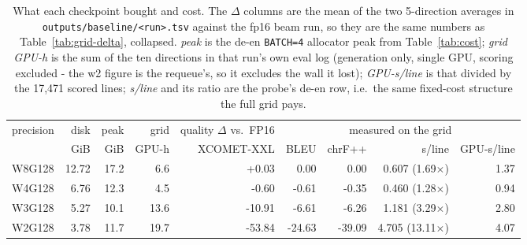 \begin{table}[t]
\centering
\footnotesize
\setlength{\tabcolsep}{4pt}
\begin{tabular}{lrrrrrrrr}
\toprule
precision & disk & peak & grid & quality $\Delta$ vs.\ FP16 & \multicolumn{4}{c}{measured on the grid} \\
\cmidrule(lr){6-6}\cmidrule(lr){7-9}
& GiB & GiB & GPU-h & XCOMET-XXL & BLEU & chrF++ & s/line & GPU-s/line \\
\midrule
W8G128 & 12.72 & 17.2 & 6.6 & +0.03 & 0.00 & 0.00 & 0.607 (1.69$\times$) & 1.37 \\
W4G128 & 6.76 & 12.3 & 4.5 & -0.60 & -0.61 & -0.35 & 0.460 (1.28$\times$) & 0.94 \\
W3G128 & 5.27 & 10.1 & 13.6 & -10.91 & -6.61 & -6.26 & 1.181 (3.29$\times$) & 2.80 \\
W2G128 & 3.78 & 11.7 & 19.7 & -53.84 & -24.63 & -39.09 & 4.705 (13.11$\times$) & 4.07 \\
\bottomrule
\end{tabular}
\caption{What each checkpoint bought and cost. The $\Delta$ columns are the mean of the two 5-direction averages in \texttt{outputs/baseline/<run>.tsv} against the fp16 beam run, so they are the same numbers as Table~\ref{tab:grid-delta}, collapsed. \emph{peak} is the de-en \texttt{BATCH=4} allocator peak from Table~\ref{tab:cost}; \emph{grid GPU-h} is the sum of the ten directions in that run's own eval log (generation only, single GPU, scoring excluded - the w2 figure is the requeue's, so it excludes the wall it lost); \emph{GPU-s/line} is that divided by the 17,471 scored lines; \emph{s/line} and its ratio are the probe's de-en row, i.e.\ the same fixed-cost structure the full grid pays.}
\label{tab:benefit}
\end{table}

